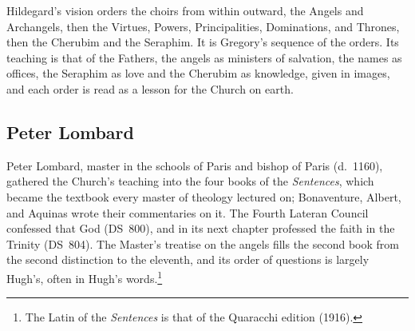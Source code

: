 Hildegard's vision orders the choirs from within outward, the Angels and
Archangels, then the Virtues, Powers, Principalities, Dominations, and
Thrones, then the Cherubim and the Seraphim. It is Gregory's sequence of the
orders. Its teaching is that of the Fathers, the angels as ministers of
salvation, the names as offices, the Seraphim as love and the Cherubim as
knowledge, given in images, and each order is read as a lesson for the
Church on earth.

\sectionguard
\subsection{Peter Lombard}\label{sec:fa-lombard}

Peter Lombard, master in the schools of Paris and bishop of Paris
(d.~1160), gathered the Church's teaching into the four books of the
\emph{Sentences}, which became the textbook every master of theology
lectured on; Bonaventure, Albert, and Aquinas wrote their commentaries on
it. The Fourth Lateran Council confessed that God  (DS~800), and in its next chapter professed
the faith in the Trinity  (DS~804). The
Master's treatise on the angels fills the second book from the second
distinction to the eleventh, and its order of questions is largely Hugh's,
often in Hugh's words.\footnote{The Latin of the \emph{Sentences} is that
of the Quaracchi edition (1916).}

